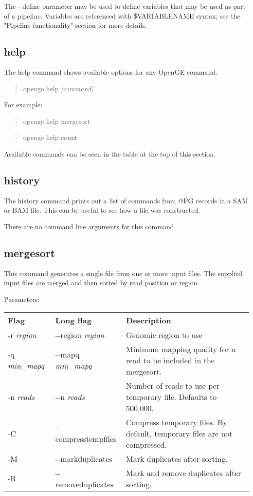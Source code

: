 \documentclass[11pt]{article}
\newcommand {\cmd}[1] {\begin{quote}#1\end{quote}}
\begin{document}
The {-}{-}define parameter may be used to define variables that may be used as part of a pipeline. Variables are referenced with \$VARIABLENAME syntax; see the "Pipeline functionality" section for more details.

\subsection {help}
The help command shows available options for any OpenGE command. 

\cmd{openge help \textit{[command]}}

For example:

\cmd{openge help mergesort}

\cmd{openge help count}

Available commands can be seen in the table at the top of this section.

\subsection {history}
The history command prints out a list of commands from @PG records in a SAM or BAM file. This can be useful to see how a file was constructed.

There are no command line arguments for this command.

\subsection {mergesort}
This command generates a single file from one or more input files. The supplied input files are merged and then sorted by read position or region.

Parameters:
\begin{center}
\begin{tabular}{llp{3.5in}}
\hline
Flag&Long flag&Description\\ \hline
-r \textit{region}&{-}{-}region \textit{region}&Genomic region to use\\
-q \textit{min\_mapq}&{-}{-}mapq \textit{min\_mapq}&Minimum mapping quality for a read to be included in the mergesort.\\
-n \textit{reads}&{-}{-}n \textit{reads}&Number of reads to use per temporary file. Defaults to 500,000.\\
-C&{-}{-}compresstempfiles&Compress temporary files. By default, temporary files are not compressed.\\
-M&{-}{-}markduplicates&Mark duplicates after sorting.\\
-R&{-}{-}removeduplicates&Mark and remove duplicates after sorting.\\
\end{tabular}
\end{center}
\end{document}
